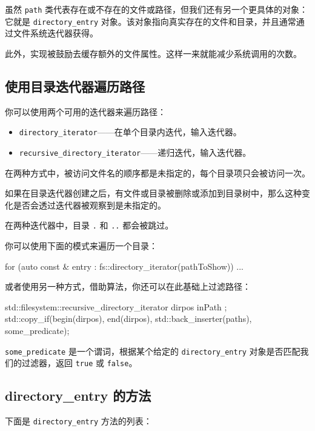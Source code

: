 虽然 \texttt{path} 类代表存在或不存在的文件或路径，但我们还有另一个更具体的对象：它就是 \texttt{directory\_entry} 对象。该对象指向真实存在的文件和目录，并且通常通过文件系统迭代器获得。

此外，实现被鼓励去缓存额外的文件属性。这样一来就能减少系统调用的次数。

\subsection{使用目录迭代器遍历路径}

你可以使用两个可用的迭代器来遍历路径：

\begin{itemize}
\item \texttt{directory\_iterator}——在单个目录内迭代，输入迭代器。
\item \texttt{recursive\_directory\_iterator}——递归迭代，输入迭代器。
\end{itemize}

在两种方式中，被访问文件名的顺序都是未指定的，每个目录项只会被访问一次。

如果在目录迭代器创建之后，有文件或目录被删除或添加到目录树中，那么这种变化是否会透过迭代器被观察到是未指定的。

在两种迭代器中，目录 \texttt{.} 和 \texttt{..} 都会被跳过。

你可以使用下面的模式来遍历一个目录：

\begin{codebox}[cpp]
for (auto const & entry : fs::directory_iterator(pathToShow))
{
    ...
}
\end{codebox}

或者使用另一种方式，借助算法，你还可以在此基础上过滤路径：

\begin{codebox}[cpp]
std::filesystem::recursive_directory_iterator dirpos{ inPath };
std::copy_if(begin(dirpos), end(dirpos), std::back_inserter(paths),
    some_predicate);
\end{codebox}

\texttt{some\_predicate} 是一个谓词，根据某个给定的 \texttt{directory\_entry} 对象是否匹配我们的过滤器，返回 \texttt{true} 或 \texttt{false}。

\subsection{directory\_entry 的方法}

下面是 \texttt{directory\_entry} 方法的列表：

